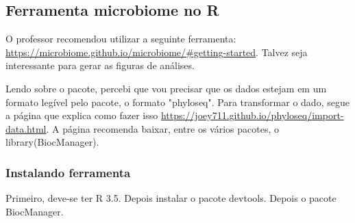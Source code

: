 \documentclass[12pt, a4paper]{report}
\begin{document}
\subsection{Ferramenta microbiome no R}
O professor recomendou utilizar a seguinte ferramenta: \url{https://microbiome.github.io/microbiome/#getting-started}. Talvez seja interessante para gerar as figuras de análises.

Lendo sobre o pacote, percebi que vou precisar que os dados estejam em um formato legível pelo pacote, o formato "phyloseq". Para transformar o dado, segue a página que explica como fazer isso \url{https://joey711.github.io/phyloseq/import-data.html}.
A página recomenda baixar, entre os vários pacotes, o library(BiocManager). 
\subsubsection{Instalando ferramenta}
Primeiro, deve-se ter R 3.5. Depois instalar o pacote devtools. Depois o pacote BiocManager. 


\newpage
\end{document}
